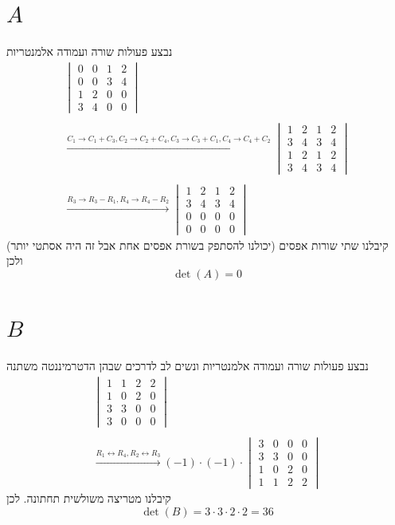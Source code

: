 \documentclass[12pt, titlepage]{article}
\begin{document}
\section*{$A$}
נבצע פעולות שורה ועמודה אלמנטריות
\begin{gather*}
 \begin{vmatrix}
            0 & 0 & 1 & 2 \\
            0 & 0 & 3 & 4 \\
            1 & 2 & 0 & 0 \\
            3 & 4 & 0 & 0
    \end{vmatrix} \\ \\
    \xrightarrow{C_1 \to C_1 + C_3, C_2 \to C_2 + C_4,C_3 \to C_3 + C_1, C_4 \to C_4 + C_2} \begin{vmatrix}
            1 & 2 & 1 & 2 \\
            3 & 4 & 3 & 4 \\
            1 & 2 & 1 & 2 \\
            3 & 4 & 3 & 4
    \end{vmatrix} \\ \\
    \xrightarrow{R_3 \to R_3 - R_1, R_4 \to R_4 - R_2} \begin{vmatrix}
            1 & 2 & 1 & 2 \\
            3 & 4 & 3 & 4 \\
            0 & 0 & 0 & 0 \\
            0 & 0 & 0 & 0
    \end{vmatrix}
\end{gather*}
קיבלנו שתי שורות אפסים (יכולנו להסתפק בשורת אפסים אחת אבל זה היה אסתטי יותר) ולכן
\[
    \boxed{\det\left(A\right)=0}
\]
\section*{$B$}
נבצע פעולות שורה ועמודה אלמנטריות ונשים לב לדרכים שבהן הדטרמיננטה משתנה
\begin{gather*}
    \begin{vmatrix}
        1 & 1 & 2 & 2\\
        1 & 0 & 2 & 0\\
        3 & 3 & 0 & 0 \\
        3 & 0 & 0 & 0
    \end{vmatrix}\\ \\
\xrightarrow{R_1 \leftrightarrow R_4, R_2 \leftrightarrow R_3 } \left(-1\right) \cdot \left(-1\right) \cdot \begin{vmatrix}
        3 & 0 & 0 & 0\\
        3 & 3 & 0 & 0 \\
        1 & 0 & 2 & 0\\
        1 & 1 & 2 & 2
\end{vmatrix}
\end{gather*}
קיבלנו מטריצה משולשית תחתונה. לכן
\[
    \boxed{\det\left(B\right) = 3 \cdot 3 \cdot 2 \cdot 2 = 36}
\]
\end{document}
